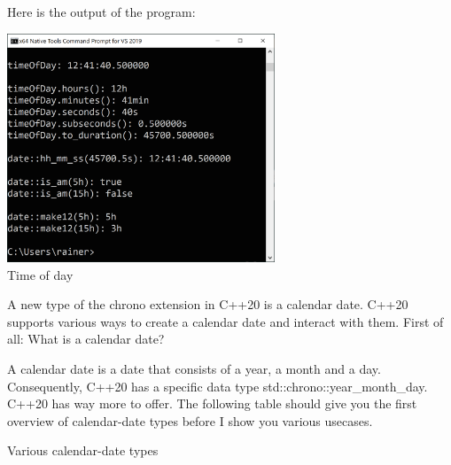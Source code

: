 Here is the output of the program:

\begin{center}
\includegraphics[width=0.6\textwidth]{content/3/chapter5/images/19.png}\\
Time of day
\end{center}



A new type of the chrono extension in C++20 is a calendar date. C++20 supports various ways to create a calendar date and interact with them. First of all: What is a calendar date?

A calendar date is a date that consists of a year, a month and a day. Consequently, C++20 has a specific data type std::chrono::year\_month\_day. C++20 has way more to offer. The following table should give you the first overview of calendar-date types before I show you various usecases.

\begin{center}
Various calendar-date types
\end{center}

